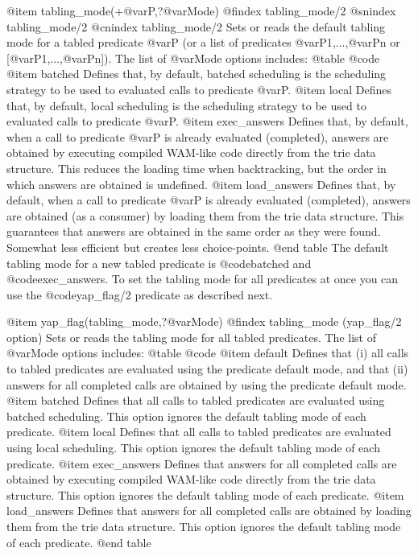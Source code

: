{{{{{{{{@item tabling_mode(+@var{P},?@var{Mode})
@findex tabling_mode/2
@snindex tabling_mode/2
@cnindex tabling_mode/2
Sets or reads the default tabling mode for a tabled predicate @var{P}
(or a list of predicates @var{P1},...,@var{Pn} or
[@var{P1},...,@var{Pn}]). The list of @var{Mode} options includes:
@table @code
@item batched
      Defines that, by default, batched scheduling is the scheduling
      strategy to be used to evaluated calls to predicate @var{P}.
@item local
      Defines that, by default, local scheduling is the scheduling
      strategy to be used to evaluated calls to predicate @var{P}.
@item exec_answers
      Defines that, by default, when a call to predicate @var{P} is
      already evaluated (completed), answers are obtained by executing
      compiled WAM-like code directly from the trie data
      structure. This reduces the loading time when backtracking, but
      the order in which answers are obtained is undefined.
@item load_answers
      Defines that, by default, when a call to predicate @var{P} is
      already evaluated (completed), answers are obtained (as a
      consumer) by loading them from the trie data structure. This
      guarantees that answers are obtained in the same order as they
      were found. Somewhat less efficient but creates less choice-points.
@end table
The default tabling mode for a new tabled predicate is @code{batched}
and @code{exec_answers}. To set the tabling mode for all predicates at
once you can use the @code{yap_flag/2} predicate as described next.

@item yap_flag(tabling_mode,?@var{Mode})
@findex tabling_mode (yap_flag/2 option)
Sets or reads the tabling mode for all tabled predicates. The list of
@var{Mode} options includes:
@table @code
@item default
      Defines that (i) all calls to tabled predicates are evaluated
      using the predicate default mode, and that (ii) answers for all
      completed calls are obtained by using the predicate default mode.
@item batched
      Defines that all calls to tabled predicates are evaluated using
      batched scheduling. This option ignores the default tabling mode
      of each predicate.
@item local
      Defines that all calls to tabled predicates are evaluated using
      local scheduling. This option ignores the default tabling mode
      of each predicate.
@item exec_answers
      Defines that answers for all completed calls are obtained by
      executing compiled WAM-like code directly from the trie data
      structure. This option ignores the default tabling mode
      of each predicate.
@item load_answers
      Defines that answers for all completed calls are obtained by
      loading them from the trie data structure. This option ignores
      the default tabling mode of each predicate.
@end table

}}}}}}}}
